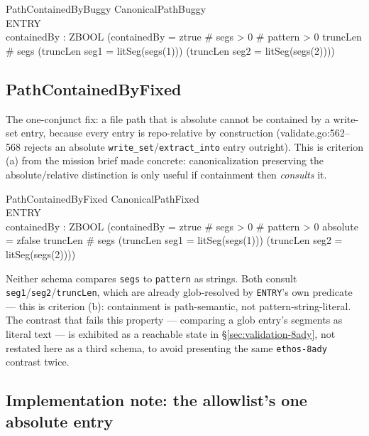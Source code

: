 \documentclass[a4paper,10pt,fleqn]{article}
\newcommand{\field}[1]{\texttt{#1}}
\begin{document}
\begin{schema}{PathContainedByBuggy}
CanonicalPathBuggy \\
ENTRY \\
containedBy : ZBOOL
\where
(containedBy = ztrue \iff
  \# segs > 0 \land \# pattern > 0 \land
  truncLen \leq \# segs \land
  (truncLen  \implies seg1 = litSeg(segs(1))) \land
  (truncLen  \implies seg2 = litSeg(segs(2))))
\end{schema}

\subsection{PathContainedByFixed}

The one-conjunct fix: a file path that is absolute cannot be
contained by a write-set entry, because every entry is repo-relative
by construction (validate.go:562--568 rejects an absolute
\field{write\_set}/\field{extract\_into} entry outright). This is
criterion (a) from the mission brief made concrete: canonicalization
preserving the absolute/relative distinction is only useful if
containment then \emph{consults} it.

\begin{schema}{PathContainedByFixed}
CanonicalPathFixed \\
ENTRY \\
containedBy : ZBOOL
\where
(containedBy = ztrue \iff
  \# segs > 0 \land \# pattern > 0 \land
  absolute = zfalse \land
  truncLen \leq \# segs \land
  (truncLen  \implies seg1 = litSeg(segs(1))) \land
  (truncLen  \implies seg2 = litSeg(segs(2))))
\end{schema}

Neither schema compares \field{segs} to \field{pattern} as strings.
Both consult \field{seg1}/\field{seg2}/\field{truncLen}, which are
already glob-resolved by \field{ENTRY}'s own predicate --- this is
criterion (b): containment is path-semantic, not
pattern-string-literal. The contrast that fails this property ---
comparing a glob entry's segments as literal text --- is exhibited
as a reachable state in \S\ref{sec:validation-8ady}, not restated
here as a third schema, to avoid presenting the same
\field{ethos-8ady} contrast twice.

\subsection{Implementation note: the allowlist's one absolute entry}
\label{sec:implnote}
\end{document}
